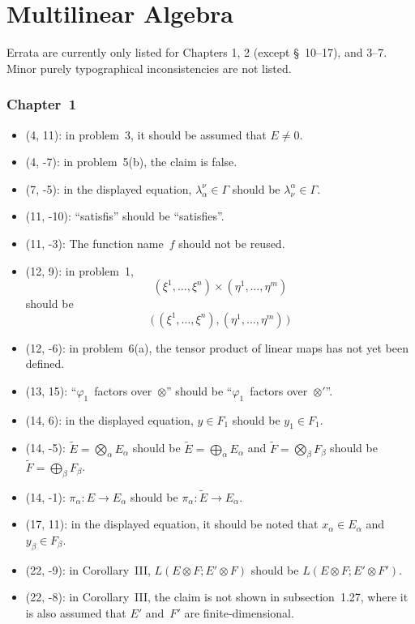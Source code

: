 \documentclass[letterpaper,12pt]{article}
\newcommand{\bigdsum}{\bigoplus}
\newcommand{\tprod}{\otimes}
\newcommand{\bigtprod}{\bigotimes}
\begin{document}
\newpage
\part*{Multilinear Algebra}
Errata are currently only listed for Chapters 1, 2 (except \S~10--17), and 3--7. Minor purely typographical inconsistencies are not listed.

\section*{Chapter~1}
\begin{itemize}
\item (4, 11): in problem~3, it should be assumed that \(E\ne 0\).
\item (4, -7): in problem~5(b), the claim is false.
\item (7, -5): in the displayed equation, \(\lambda^{\nu}_{\alpha}\in\Gamma\) should be \(\lambda^{\alpha}_{\nu}\in\Gamma\).
\item (11, -10): ``satisfis'' should be ``satisfies''.
\item (11, -3): The function name~\(f\) should not be reused.
\item (12, 9): in problem~1,
\[(\xi^1,\ldots,\xi^n)\times(\eta^1,\ldots,\eta^m)\]
should be
\[\bigl(\,(\xi^1,\ldots,\xi^n),(\eta^1,\ldots,\eta^m)\,\bigr)\]
\item (12, -6): in problem~6(a), the tensor product of linear maps has not yet been defined.
\item (13, 15): ``\(\varphi_1\)~factors over~\(\tprod\)'' should be ``\(\varphi_1\)~factors over~\(\tprod'\)''.
\item (14, 6): in the displayed equation, \(y\in F_1\) should be \(y_1\in F_1\).
\item (14, -5): \(\widetilde{E}=\bigtprod_{\alpha}E_{\alpha}\) should be \(\widetilde{E}=\bigdsum_{\alpha}E_{\alpha}\) and \(\widetilde{F}=\bigtprod_{\beta}F_{\beta}\) should be \(\widetilde{F}=\bigdsum_{\beta}F_{\beta}\).
\item (14, -1): \(\pi_{\alpha}:E\to E_{\alpha}\) should be \(\pi_{\alpha}:\widetilde{E}\to E_{\alpha}\).
\item (17, 11): in the displayed equation, it should be noted that \(x_{\alpha}\in E_{\alpha}\) and \(y_{\beta}\in F_{\beta}\).
\item (22, -9): in Corollary~III, \(L(E\tprod F;E'\tprod F)\) should be \(L(E\tprod F;E'\tprod F')\).
\item (22, -8): in Corollary~III, the claim is not shown in subsection~1.27, where it is also assumed that \(E'\) and~\(F'\) are finite-dimensional.

\end{itemize}
\end{document}
